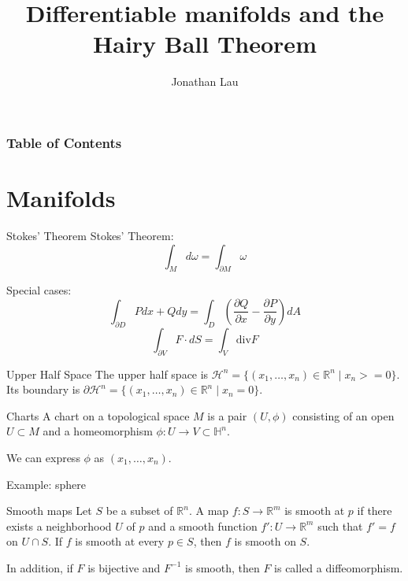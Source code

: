 \documentclass[9pt]{beamer}
\title[Differentiable manifolds and the Hairy Ball Theorem]
{Differentiable manifolds and the Hairy Ball Theorem}
\author[Jonathan Lau] %
{Jonathan Lau}
\begin{document}
	
\frame{\titlepage}

\begin{frame}
	\frametitle{Table of Contents}
	\tableofcontents
\end{frame}

\section{Manifolds}
	
\begin{frame}{Stokes' Theorem}
    Stokes' Theorem:\[\int_Md\omega = \int_{\partial M} \omega\]

    Special cases: \[\int_{\partial D} Pdx+Qdy = \int_D \left(\frac{\partial Q}{\partial x}-\frac{\partial P}{\partial y}\right) dA\]
    \[\int_{\partial V}  F\cdot dS = \int_V \text{div} F\]
\end{frame}

\begin{frame}
    \begin{block}{Upper Half Space}
        The upper half space is $\mathcal{H}^n=\{(x_1, \dots, x_n)\in \mathbb{R}^n\mid x_n >= 0\}$. Its boundary is $\partial \mathcal{H}^n = \{(x_1, \dots, x_n)\in \mathbb{R}^n\mid x_n = 0\}$.
    \end{block}

    \begin{block}{Charts}
        A chart on a topological space $M$ is a pair $(U, \phi)$ consisting of an open $U\subset M$ and a homeomorphism $\phi:U\rightarrow V\subset\mathbb{H}^n$.
    \end{block}

    We can express $\phi$ as $(x_1, \dots, x_n)$.

    Example: sphere
    
    \begin{block}{Smooth maps}
        Let $S$ be a subset of $\mathbb{R}^n$. A map $f:S \rightarrow \mathbb{R}^m$ is smooth at $p$ if there exists a neighborhood $U$ of $p$ and a smooth function $f':U \rightarrow \mathbb{R}^m$ such that $f'=f$ on $U\cap S$. If $f$ is smooth at every $p\in S$, then $f$ is smooth on $S$.

        In addition, if $F$ is bijective and $F^{-1}$ is smooth, then $F$ is called a diffeomorphism.
    \end{block}

\end{frame}
\end{document}
